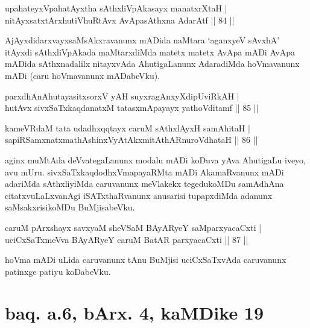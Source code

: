 
\begin{shl}
upahateyxVpahatAyxtha sAthxliVpAkasayx manatxrXtaH | \\
nitAyxsatxtArx\s \s hutiVhuRtAvx AvApasAthxna AdarAtf \hfill|| 84 || 
\end{shl}

\begin{artha}
AjAyxdidarxvayxsaMsAkxravanunx mADida naMtara `aganxyeV sAvxhA' 
itAyxdi sAthxliVpAkada maMtarxdiMda matetx matetx AvApa mADi AvApa 
mADida sAthxnadalilx nitayxvAda AhutigaLanunx AdaradiMda hoVmavanunx 
mADi (caru hoVmavanunx mADabeVku).
\end{artha}


\begin{shl}
parxdhAnAhutayasitxsorxV yAH suyxragAnxyXdipUviRkAH | \\
hutAvx sivxSaTxkaqdanatxM tatasxmApayayx yathoVditamf \hfill|| 85 || 
\end{shl}

\begin{shl}
kameVRdaM tata udadhxqqtayx caruM sAthxlAyxH samAhitaH | \\
sapiRSamxnatxmathAshinxVyAtAkxmitAthARnuroVdhataH \hfill|| 86 || 
\end{shl}

\begin{artha}
aginx muMtAda deVvategaLanunx modalu mADi koDuva yAva AhutigaLu iveyo, 
avu mUru. sivxSaTxkaqdodhxVmapayaRMta mADi AkamaRvanunx mADi 
adariMda sAthxliyiMda caruvanunx meVlakekx tegedukoMDu samAdhAna 
citatxvuLaLxvanAgi iSATxthaRvanunx anusarisi tupapxdiMda adanunx 
saMsakxrisikoMDu BuMjisabeVku.
\end{artha}


\begin{shl}
caruM pArxshayx savxyaM sheVSaM BAyARyeY saMparxyacaCxti | \\
uciCxSaTxmeVva BAyARyeY caruM BatAR parxyacaCxti \hfill|| 87 || 
\end{shl}

\begin{artha}
hoVma mADi uLida caruvanunx tAnu BuMjisi uciCxSaTxvAda caruvanunx 
patinxge patiyu koDabeVku.
\end{artha}

\section*{baq. a.6, bArx. 4, kaMDike 19}

